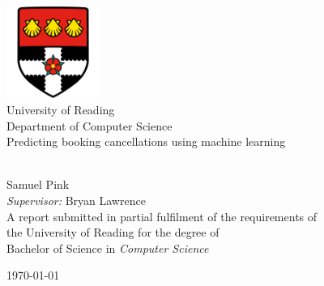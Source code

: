 \documentclass[a4paper,11pt,oneside]{book}
\begin{document}
    
    \frontmatter
          
    \begin{titlepage}      
        \begin{center}
            \includegraphics[width=3cm]{figures/uorlogo.png}\\[0.5cm]
            {\LARGE University of Reading\\[0.5cm]
                Department of Computer Science}\\[2cm]
            
            
            \linespread{1.2}\huge {Predicting booking cancellations using machine learning}
            
            
            \linespread{1}~\\[2cm]
            
            {\Large Samuel Pink}\\[1cm] 
            
            {\large \emph{Supervisor:} Bryan Lawrence}\\[1cm] %
            
            \large A report submitted in partial fulfilment of the requirements of\\the University of Reading for the degree of\\ Bachelor of Science in \textit{Computer Science}\\[0.3cm] 
            \vfill
            
            
            \today %
        \end{center}
    \end{titlepage}
\end{document}
